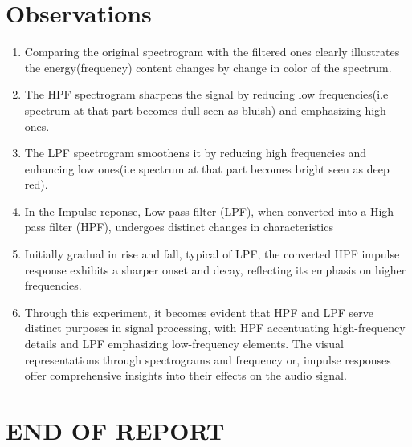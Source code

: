 \documentclass[journal,12pt,onecolumn]{IEEEtran}
\theoremstyle{remark}
\begin{document}
\section{Observations}
\begin{enumerate}
\item Comparing the original spectrogram with the filtered ones clearly illustrates the energy(frequency) content changes by change in color of the spectrum.
\item The HPF spectrogram sharpens the signal by reducing low frequencies(i.e spectrum at that part becomes dull seen as bluish) and emphasizing high ones.
\item The LPF spectrogram smoothens it by reducing high frequencies and enhancing low ones(i.e spectrum at that part becomes bright seen as deep red).
\item In the Impulse reponse, Low-pass filter (LPF), when converted into a High-pass filter (HPF), undergoes distinct changes in characteristics 
\item Initially gradual in rise and fall, typical of LPF, the converted HPF impulse response exhibits a sharper onset and decay, reflecting its emphasis on higher frequencies. 
\item Through this experiment, it becomes evident that HPF and LPF serve distinct purposes in signal processing, with HPF accentuating high-frequency details and LPF emphasizing low-frequency elements. The visual representations through spectrograms and frequency or, impulse responses offer comprehensive insights into their effects on the audio signal.
\end{enumerate}
\section*{END OF REPORT}
\end{document}
